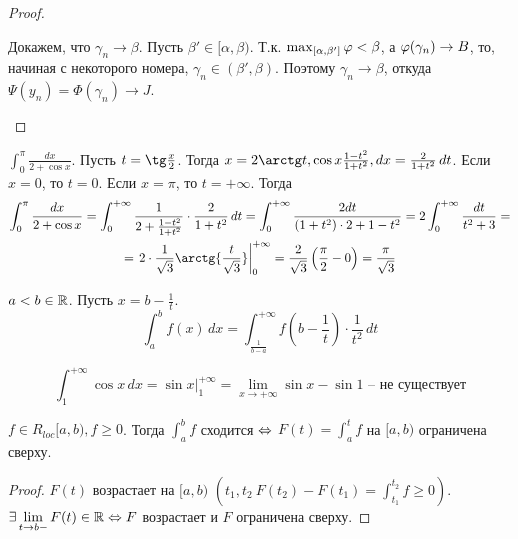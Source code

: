 \begin{MyList}
\begin{proof}
\begin{MyList}
			Докажем, что $\gamma_n \to \beta$. Пусть $\beta' \in [\alpha, \beta)$. Т.к. $\max_{[\alpha, \beta']} \varphi < \beta$, а
			$\varphi(\gamma_n) \to B$, то, начиная с некоторого номера, $\gamma_n \in (\beta', \beta)$. Поэтому $\gamma_n \to \beta$, откуда $\Psi(y_n) = \Phi(\gamma_n) \to J$.     
		\end{MyList}
	\end{proof}

	\begin{Example}
		$\int_0^\pi \frac{dx}{2 + \cos x}$. Пусть $t = \tg \frac{x}{2}$. Тогда $x = 2 \arctg t, \cos x \frac{1 - t^2}{1 + t^2}, dx = \frac{2}{1 + t^2}\,dt$. 
		Если $x = 0$, то $t = 0$. Если $x = \pi$, то $t = +\infty$. Тогда
		\begin{gather*}
		\int_0^\pi \frac{dx}{2 + \cos x} = \int_0^{+\infty} \frac{1}{2 + \frac{1 - t^2}{1 + t^2}} \cdot \frac{2}{1 + t^2}\,dt = \int_0^{+\infty} \frac{2dt}{(1 + t^2) \cdot 2 + 1 - t^2} = 2 \int_0^{+\infty} \frac{dt}{t^2 + 3} = \\
		=  \left.2 \cdot \frac{1}{\sqrt{3}} \arctg{\frac{t}{\sqrt{3}}}\right|_0^{+\infty} = \frac{2}{\sqrt{3}}\left(\frac{\pi}{2} - 0\right) = \frac{\pi}{\sqrt{3}}
		\end{gather*}
	\end{Example}

	\begin{Rem}
		$a < b \in \mathbb{R}$. Пусть $x = b - \frac{1}{t}$.
		\[\int_a^b f(x) \,dx = \int_{\frac{1}{b - a}}^{+\infty} f\left(b - \frac{1}{t}\right)\cdot \frac{1}{t^2}\,dt\]
	\end{Rem}

	\begin{Example}
		\[\int_1^{+\infty} \cos x \,dx = \left.\sin x\right|_1^{+\infty} = \lim_{x \to +\infty} \sin x - \sin 1 \textrm{ -- не существует}\]
	\end{Example}
\end{MyList}


\begin{Lm}
	$f \in R_{loc} [a, b), f \geqslant 0$. Тогда $\int_a^b f$ сходится $\Leftrightarrow$ $F(t) = \int_a^t f$ на $[a, b)$ ограничена сверху. 
\end{Lm}

\begin{proof}
	$F(t)$ возрастает на $[a, b)$ $\left(t_1, t_2 \ F(t_2) - F(t_1) = \int_{t_1}^{t_2} f \geqslant 0\right)$.
	$\displaystyle{\exists \lim_{t \to b-} F(t) \in \mathbb{R}\Leftrightarrow F}$ возрастает и $F$ ограничена сверху. 
\end{proof}

